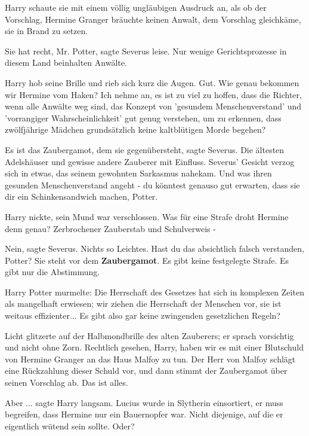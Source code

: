 Harry schaute sie mit einem völlig ungläubigen Ausdruck an, als ob der
Vorschlag, Hermine Granger bräuchte keinen Anwalt, dem Vorschlag gleichkäme, sie
in Brand zu setzen.

\glqq{}Sie hat recht, Mr. Potter\grqq{}, sagte Severus leise. \glqq{}Nur wenige
Gerichtsprozesse in diesem Land beinhalten Anwälte.\grqq{}

Harry hob seine Brille und rieb sich kurz die Augen. \glqq{}Gut. Wie genau
bekommen wir Hermine vom Haken? Ich nehme an, es ist zu viel zu hoffen, dass die
Richter, wenn alle Anwälte weg sind, das Konzept von 'gesundem Menschenverstand'
und 'vorrangiger Wahrscheinlichkeit' gut genug verstehen, um zu erkennen, dass
zwölfjährige Mädchen grundsätzlich keine kaltblütigen Morde begehen?\grqq{}

\glqq{}Es ist das Zaubergamot, dem sie gegenübersteht\grqq{}, sagte Severus.
\glqq{}Die ältesten Adelshäuser und gewisse andere Zauberer mit Einfluss.\grqq{}
Severus' Gesicht verzog sich in etwas, das seinem gewohnten Sarkasmus nahekam.
\glqq{}Und was ihren gesunden Menschenverstand angeht - du könntest genauso gut
erwarten, dass sie dir ein Schinkensandwich machen, Potter.\grqq{}

Harry nickte, sein Mund war verschlossen. \glqq{}Was für eine Strafe droht
Hermine denn genau? Zerbrochener Zauberstab und Schulverweis -\grqq{}

\glqq{}Nein\grqq{}, sagte Severus. \glqq{}Nichts so Leichtes. Hast du das
absichtlich falsch verstanden, Potter? Sie steht vor dem \textbf{Zaubergamot}.
Es gibt keine festgelegte Strafe. Es gibt nur die Abstimmung.\grqq{}

Harry Potter murmelte: \glqq{}Die Herrschaft des Gesetzes hat sich in komplexen
Zeiten als mangelhaft erwiesen; wir ziehen die Herrschaft der Menschen vor, sie
ist weitaus effizienter... Es gibt also gar keine zwingenden gesetzlichen
Regeln?\grqq{}

Licht glitzerte auf der Halbmondbrille des alten Zauberers; er sprach vorsichtig
und nicht ohne Zorn. \glqq{}Rechtlich gesehen, Harry, haben wir es mit einer
Blutschuld von Hermine Granger an das Haus Malfoy zu tun. Der Herr von Malfoy
schlägt eine Rückzahlung dieser Schuld vor, und dann stimmt der Zaubergamot über
seinen Vorschlag ab. Das ist alles.\grqq{}

\glqq{}Aber ...\grqq{} sagte Harry langsam. \glqq{}Lucius wurde in Slytherin
einsortiert, er muss begreifen, dass Hermine nur ein Bauernopfer war. Nicht
diejenige, auf die er eigentlich wütend sein sollte. Oder?\grqq{}

